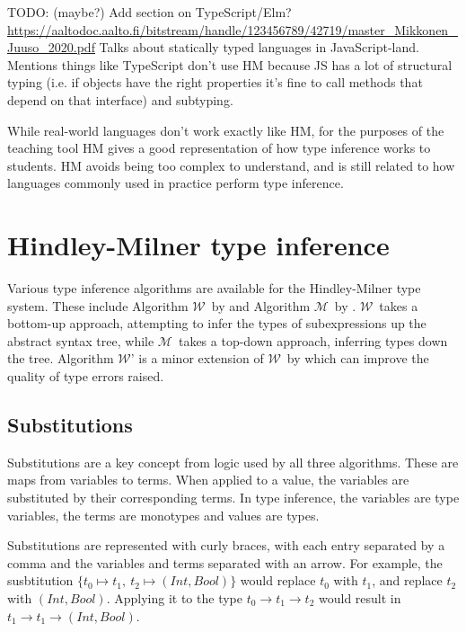 \documentclass[a4paper,fleqn,oneside,12pt]{report}
\newcommand{\W}{$\mathcal{W}$}
\newcommand{\M}{$\mathcal{M}$}
\begin{document}
TODO: (maybe?) Add section on TypeScript/Elm?
\underline{\href{https://aaltodoc.aalto.fi/bitstream/handle/123456789/42719/master\_Mikkonen\_Juuso\_2020.pdf}{https://aaltodoc.aalto.fi/bitstream/handle/123456789/42719/master\_Mikkonen\_Juuso\_2020.pdf}}
Talks about statically typed languages in JavaScript-land. Mentions things like TypeScript don’t use HM because JS has a lot of structural typing (i.e. if objects have the right properties it’s fine to call methods that depend on that interface) and subtyping.

While real-world languages don't work exactly like HM, for the purposes of the teaching tool HM gives a good representation of how type inference works to students. HM avoids being too complex to understand, and is still related to how languages commonly used in practice perform type inference.

\section{Hindley-Milner type inference}\label{id:h.admfqf7bhkct}

Various type inference algorithms are available for the Hindley-Milner type system. These include Algorithm \W\ by \cite{ref13} and Algorithm \M\ by \cite{ref27}. \W\ takes a bottom-up approach, attempting to infer the types of subexpressions up the abstract syntax tree, while \M\ takes a top-down approach, inferring types down the tree. Algorithm \W' is a minor extension of \W\ by \cite{ref28} which can improve the quality of type errors raised.

\subsection{Substitutions}

Substitutions are a key concept from logic used by all three algorithms. These are maps from variables to terms. When applied to a value, the variables are substituted by their corresponding terms. In type inference, the variables are type variables, the terms are monotypes and values are types.

Substitutions are represented with curly braces, with each entry separated by a comma and the variables and terms separated with an arrow. For example, the susbtitution $\{ t_0 \mapsto t_1,\ t_2 \mapsto (Int, Bool) \}$ would replace $t_0$ with $t_1$, and replace $t_2$ with $(Int, Bool)$. Applying it to the type $t_0 \rightarrow t_1 \rightarrow t_2$ would result in $t_1 \rightarrow t_1 \rightarrow (Int, Bool)$.
\end{document}
